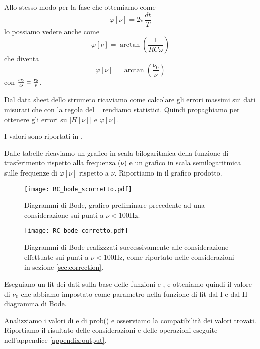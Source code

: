 \documentclass[
    rmp,
    reprint, 
    superscriptaddress, 
    altaffilletter, 
    amsmath, 
    amssymb, 
    a4paper]{revtex4-2}
\begin{document}
Allo stesso modo per la fase che ottemiamo come \[\varphi[\nu]=2\pi\frac{dt}{T}\] lo possiamo vedere anche come \[\varphi[\nu]=\arctan\left(\frac{1}{RC\omega}\right)\] che diventa \begin{equation} \varphi[\nu]=\arctan\left(\frac{\nu_0}{\nu}\right) \label{eqn:phi}\end{equation} con ${\omega_0\over\omega} = {\nu_0\over\nu}$.

Dal data sheet dello strumeto ricaviamo come calcolare gli errori massimi sui dati misurati che con la regola del \treSigma~ rendiamo statistici. Quindi propaghiamo per ottenere gli errori su $\left|H[\nu]\right|$ e $\varphi[\nu]$.

I valori sono riportati in .

Dalle tabelle ricaviamo un grafico in scala bilogaritmica della funzione di trasferimento rispetto alla frequenza ($\nu$) e un grafico in scala semilogaritmica sulle frequenze di $\varphi[\nu]$ rispetto a $\nu$. Riportiamo in  il grafico prodotto.

\begin{figure}
    \texttt{[image: RC\_bode\_scorretto.pdf]}
    \caption{Diagrammi di Bode, grafico preliminare precedente ad una considerazione sui punti a $\nu<100$Hz.}
    \label{fig:plot}
\end{figure}
\begin{figure}[t]
    \texttt{[image: RC\_bode\_corretto.pdf]}
    \caption{Diagrammi di Bode realizzzati successivamente alle considerazione effettuate sui punti a $\nu<100$Hz, come riportato nelle considerazioni in sezione \ref{sec:correction}.}
    \label{fig:plot_correct}
\end{figure}

Eseguiano un fit dei dati sulla base delle funzioni  e , e otteniamo quindi il valore di $\nu_0$ che abbiamo impostato come parametro nella funzione di fit dal I e dal II diagramma di Bode.

Analizziamo i valori di \ChiNdf e di prob(\ChiSqr) e osserviamo la compatibilità dei valori trovati. Riportiamo il risultato delle considerazioni e delle operazioni eseguite nell'appendice \ref{appendix:output}.
\end{document}
